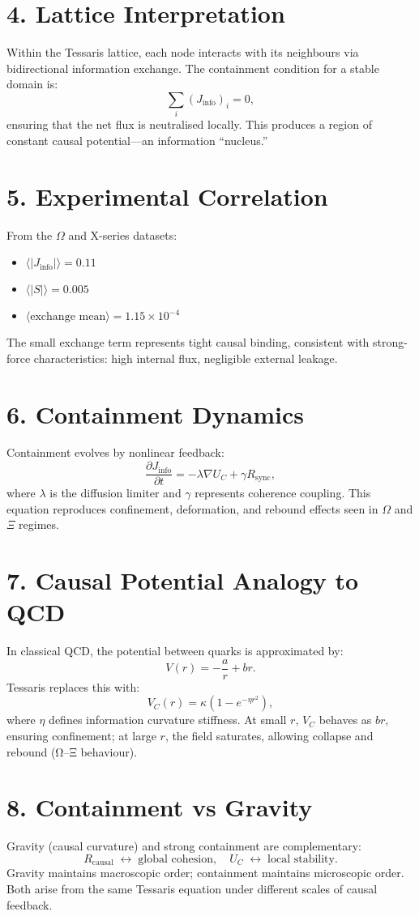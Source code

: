 \documentclass[11pt,a4paper]{article}
\begin{document}
\section{4. Lattice Interpretation}
Within the Tessaris lattice, each node interacts with its neighbours via bidirectional information exchange.  
The containment condition for a stable domain is:
\[
\sum_i (J_{\mathrm{info}})_i = 0,
\]
ensuring that the net flux is neutralised locally.  
This produces a region of constant causal potential—an information ``nucleus.''

\section{5. Experimental Correlation}
From the $\Omega$ and X-series datasets:
\begin{itemize}
\item $\langle |J_{\mathrm{info}}| \rangle = 0.11$
\item $\langle |S| \rangle = 0.005$
\item $\langle \text{exchange mean} \rangle = 1.15\times10^{-4}$
\end{itemize}
The small exchange term represents tight causal binding, consistent with strong-force characteristics: high internal flux, negligible external leakage.

\section{6. Containment Dynamics}
Containment evolves by nonlinear feedback:
\[
\frac{\partial J_{\mathrm{info}}}{\partial t} = -\lambda \nabla U_C + \gamma R_{\mathrm{sync}},
\]
where $\lambda$ is the diffusion limiter and $\gamma$ represents coherence coupling.  
This equation reproduces confinement, deformation, and rebound effects seen in $\Omega$ and $\Xi$ regimes.

\section{7. Causal Potential Analogy to QCD}
In classical QCD, the potential between quarks is approximated by:
\[
V(r) = -\frac{a}{r} + br.
\]
Tessaris replaces this with:
\[
V_C(r) = \kappa \left(1 - e^{-\eta r^2}\right),
\]
where $\eta$ defines information curvature stiffness.  
At small $r$, $V_C$ behaves as $br$, ensuring confinement; at large $r$, the field saturates, allowing collapse and rebound (Ω–Ξ behaviour).

\section{8. Containment vs Gravity}
Gravity (causal curvature) and strong containment are complementary:
\[
R_{\mathrm{causal}} \;\leftrightarrow\; \text{global cohesion}, \quad
U_C \;\leftrightarrow\; \text{local stability}.
\]
Gravity maintains macroscopic order; containment maintains microscopic order.  
Both arise from the same Tessaris equation under different scales of causal feedback.
\end{document}
